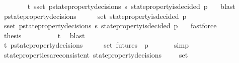 \begin{isabellebody}
\ \ \ \ \ \ \isamarkupfalse%
\ {\isacartoucheopen}{\isasymexists}{\isasymsigma}{\isasymin}{\isasymSigma}t{\isachardot}\ {\isasymforall}s{\isasymin}{\isasymsigma}{\isacharunderscore}set{\isachardot}\ {\isasymforall}p{\isasymin}state{\isacharunderscore}property{\isacharunderscore}decisions\ s{\isachardot}\ state{\isacharunderscore}property{\isacharunderscore}is{\isacharunderscore}decided\ {\isacharparenleft}p{\isacharcomma}\ {\isasymsigma}{\isacharparenright}{\isacartoucheclose}\ \isamarkupfalse%
\ blast\isanewline
\ \ \ \ \isamarkupfalse%
\ {\isachardoublequoteopen}{\isasymforall}p{\isasymin}{\isasymUnion}{\isacharbraceleft}state{\isacharunderscore}property{\isacharunderscore}decisions\ {\isasymsigma}\ {\isacharbar}\ {\isasymsigma}{\isachardot}\ {\isasymsigma}\ {\isasymin}\ {\isasymsigma}{\isacharunderscore}set{\isacharbraceright}{\isachardot}\ state{\isacharunderscore}property{\isacharunderscore}is{\isacharunderscore}decided\ {\isacharparenleft}p{\isacharcomma}{\isasymsigma}{\isacharparenright}{\isachardoublequoteclose}\isanewline
\ \ \ \ \ \ \isamarkupfalse%
\ {\isacartoucheopen}{\isasymforall}s{\isasymin}{\isasymsigma}{\isacharunderscore}set{\isachardot}\ {\isasymforall}p{\isasymin}state{\isacharunderscore}property{\isacharunderscore}decisions\ s{\isachardot}\ state{\isacharunderscore}property{\isacharunderscore}is{\isacharunderscore}decided\ {\isacharparenleft}p{\isacharcomma}\ {\isasymsigma}{\isacharparenright}{\isacartoucheclose}\ \isamarkupfalse%
\ fastforce\isanewline
\ \ \ \ \isamarkupfalse%
\ {\isacharquery}thesis\isanewline
\ \ \ \ \ \ \isamarkupfalse%
\ {\isacartoucheopen}{\isasymsigma}\ {\isasymin}\ {\isasymSigma}t{\isacartoucheclose}\ \isamarkupfalse%
\ blast\isanewline
\ \ \isamarkupfalse%
\isanewline
\ \ \isamarkupfalse%
\ {\isachardoublequoteopen}{\isasymexists}{\isasymsigma}{\isasymin}{\isasymSigma}t{\isachardot}\ {\isasymforall}p{\isasymin}{\isasymUnion}{\isacharbraceleft}state{\isacharunderscore}property{\isacharunderscore}decisions\ {\isasymsigma}\ {\isacharbar}\ {\isasymsigma}{\isachardot}\ {\isasymsigma}\ {\isasymin}\ {\isasymsigma}{\isacharunderscore}set{\isacharbraceright}{\isachardot}\ {\isasymforall}{\isasymsigma}{\isacharprime}{\isasymin}futures\ {\isasymsigma}{\isachardot}\ p\ {\isasymsigma}{\isacharprime}{\isachardoublequoteclose}\isanewline
\ \ \ \ \isamarkupfalse%
\ simp\isanewline
\ \ \isamarkupfalse%
\ {\isachardoublequoteopen}state{\isacharunderscore}properties{\isacharunderscore}are{\isacharunderscore}consistent\ {\isacharparenleft}{\isasymUnion}{\isacharbraceleft}state{\isacharunderscore}property{\isacharunderscore}decisions\ {\isasymsigma}\ {\isacharbar}{\isasymsigma}{\isachardot}\ {\isasymsigma}\ {\isasymin}\ {\isasymsigma}{\isacharunderscore}set{\isacharbraceright}{\isacharparenright}{\isachardoublequoteclose}\isanewline

\end{isabellebody}

